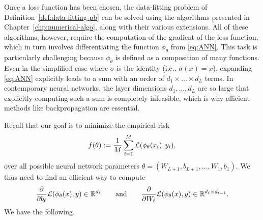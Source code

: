 Once a loss function has been chosen, the data-fitting problem of Definition~\ref{def:data-fitting-pb} can be solved using the algorithms presented in Chapter~\ref{chp:numerical-algo}, along with their various extensions.
All of these algorithms, however, require the computation of the gradient of the loss function, which in turn involves differentiating the function $\phi_\theta$ from \eqref{eq:ANN}.  
This task is particularly challenging because $\phi_\theta$ is defined as a composition of many functions. Even in the simplified case where $\sigma$ is the identity (i.e., $\sigma(x) = x$), expanding \eqref{eq:ANN} explicitly leads to a sum with an order of $d_1 \times \dots \times d_L$ terms.
In contemporary neural networks, the layer dimensions $d_1, \dots, d_L$ are so large that explicitly computing such a sum is completely infeasible, which is why efficient methods like backpropagation are essential.


Recall that our goal is to minimize the empirical risk 
\begin{equation}
    f(\theta) := \frac{1}{M}\sum_{i=1}^M \mathcal{L}(\phi_\theta(x_i),y_i),
\end{equation}
over all possible neural network parameters $\theta=(W_{L+1},b_{L+1},\ldots,W_1,b_1)$.
We thus need to find an efficient way to compute 
\begin{equation}
    \frac{\partial}{\partial b_\ell}\mathcal{L}(\phi_\theta(x),y)\in \mathbb{R}^{d_\ell}
    \qquad\text{and}\qquad
    \frac{\partial}{\partial W_\ell}\mathcal{L}(\phi_\theta(x),y)\in \mathbb{R}^{d_\ell\times d_{\ell-1}}.
\end{equation}
We have the following.

